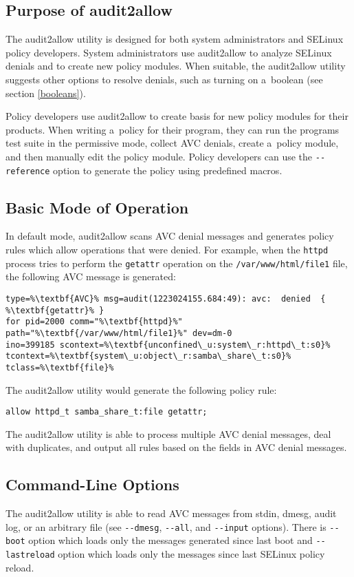 \subsection{Purpose of audit2allow}
The audit2allow utility is designed for both system administrators and SELinux
policy developers. System administrators use audit2allow to analyze SELinux
denials and to create new policy modules. When suitable, the audit2allow utility
suggests other options to resolve denials, such as turning on a~boolean (see
section \ref{booleans}).

Policy developers use audit2allow to create basis for new policy modules for
their products. When writing a~policy for their program, they can run the
programs test suite in the permissive mode, collect AVC denials, create a~policy
module, and then manually edit the policy module. Policy developers can use
the \texttt{-{}-reference} option to generate the policy using predefined
macros.

\subsection{Basic Mode of Operation}
In default mode, audit2allow scans AVC denial messages and generates policy
rules which allow operations that were denied. For example, when the
\texttt{httpd} process tries to perform the \texttt{getattr} operation on the
\texttt{/var/www/html/file1} file, the following AVC message is generated:
\begin{lstlisting}[escapechar=\%]
type=%\textbf{AVC}% msg=audit(1223024155.684:49): avc:  denied  { %\textbf{getattr}% }
for pid=2000 comm="%\textbf{httpd}%" path="%\textbf{/var/www/html/file1}%" dev=dm-0
ino=399185 scontext=%\textbf{unconfined\_u:system\_r:httpd\_t:s0}%
tcontext=%\textbf{system\_u:object\_r:samba\_share\_t:s0}% tclass=%\textbf{file}%
\end{lstlisting}
The audit2allow utility would generate the following policy rule:
\begin{lstlisting}
allow httpd_t samba_share_t:file getattr;
\end{lstlisting}
The audit2allow utility is able to process multiple AVC denial messages, deal
with duplicates, and output all rules based on the fields in AVC denial
messages.

\subsection{Command-Line Options}
The audit2allow utility is able to read AVC messages from stdin, dmesg, audit
log, or an arbitrary file (see \texttt{-{}-dmesg}, \texttt{-{}-all}, and
\texttt{-{}-input} options). There is \texttt{-{}-boot} option which loads only
the messages generated since last boot and \texttt{-{}-lastreload} option which
loads only the messages since last SELinux policy reload.

